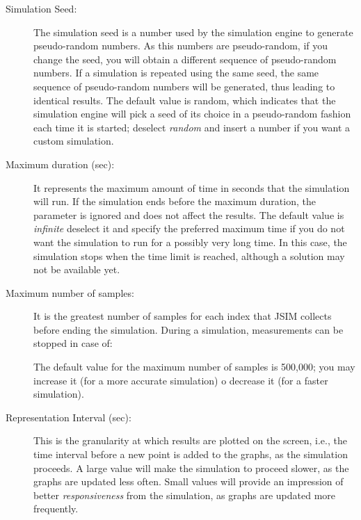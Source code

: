 \begin{description*}
\begin{description}
\item [Simulation Seed:] The simulation seed is a
number used by the simulation engine to generate pseudo-random
numbers. As this numbers are pseudo-random, if you change the
seed, you will obtain a different sequence of pseudo-random
numbers. If a simulation is repeated using the same seed, the same
sequence of pseudo-random numbers will be generated, thus leading
to identical results. The default value is random, which indicates
that the simulation engine will pick a seed of its choice in a
pseudo-random fashion each time it is started; deselect
\emph{random} and insert a number if you want a custom simulation.
\item[Maximum duration (sec):] It represents the maximum amount of
time in seconds that the simulation will run. If the simulation
ends before the maximum duration, the parameter is ignored and
does not affect the results. The default value is \emph{infinite}
deselect it and specify the preferred maximum time if you do not
want the simulation to run for a possibly very long time. In this
case, the simulation stops when the time limit is reached,
although a solution may not be available yet. \item [Maximum
number of samples:] It is the greatest number of samples for each
index that JSIM collects before ending the simulation. During a
simulation, measurements can be stopped in case of:
The default value for the maximum number of samples is 500,000; you may increase it (for a more accurate simulation) o decrease it (for a faster simulation).
\item [Representation Interval (sec):] This is the granularity at which results are plotted on the screen, i.e., the time interval before a new point is added to the graphs, as the simulation proceeds. A large value will make the simulation to proceed slower, as the graphs are updated less often. Small values will provide an impression of better \emph{responsiveness} from the simulation, as graphs are updated more frequently.

\end{description}
\end{description*}
